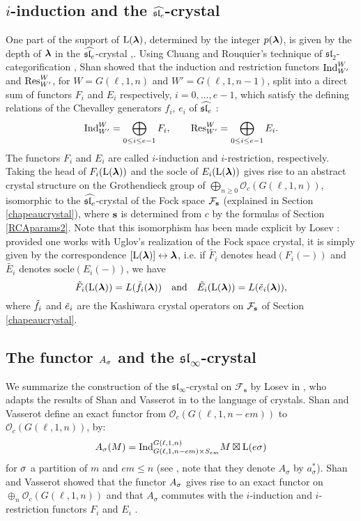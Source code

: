 \documentclass[12pt]{amsart}
\numberwithin{equation}{section}
\theoremstyle{definition}
\newcommand{\oh}{\mathcal{O}}
\newcommand{\el}{\mathrm{L}}
\newcommand{\slinf}{\mathfrak{sl}_\infty}
\newcommand{\mbs}{\mathbf{s}}
\begin{document}
\subsection{$i$-induction and the $\widehat{\mathfrak{sl}_e}$-crystal}\label{shancat} 
One part of the support of $\el(\bla)$, determined by the integer $p(\boldsymbol{\lambda})$, is  given by the depth of $\boldsymbol{\lambda}$ in the $\widehat{\mathfrak{sl}_e}$-crystal \cite{Shan2011},\cite{Losev2015}. Using Chuang and Rouquier's technique of $\mathfrak{sl}_2$-categorification \cite{ChuangRouquier2008}, Shan showed that the induction and restriction functors $\mbox{\rm Ind}_{W'}^W$ and $\mbox{\rm Res}_{W'}^W$,
for $W=G(\ell,1,n)$ and $W'=G(\ell,1,n-1)$, split into a direct sum of functors $F_i$ and $E_i$ respectively, $i=0,\dots, e-1$, which satisfy the defining relations of the Chevalley generators $f_i$, $e_i$ of $\widehat{\mathfrak{sl}_e}$ \cite{Shan2011}: 
$$\mbox{\rm Ind}_{W'}^W =\bigoplus_{0\leq i\leq e-1} F_i,\quad\quad \mbox{\rm Res}_{W'}^W=\bigoplus_{0\leq i\leq e-1}E_i.$$ 
The functors $F_i$ and $E_i$ are called $i$-induction and $i$-restriction, respectively. Taking the head of $F_i(\el(\bla))$ and the socle of $E_i(\el(\bla))$ gives rise to an abstract crystal structure on 
the Grothendieck group of $\bigoplus_{n\geq 0}\oh_c(G(\ell,1,n))$, 
isomorphic to the $\widehat{\mathfrak{sl}_e}$-crystal of the Fock space $\mathcal{F}_{\mathbf{s}}$ (explained in Section \ref{chapeaucrystal}), where $\mathbf{s}$ is determined from $c$ by the formulas of Section \ref{RCAparams2}.
Note that this isomorphism has been made explicit by Losev \cite[Theorem 5.1]{Losev2013}: 
provided one works with Uglov's realization of the Fock space crystal, it is simply given by the correspondence $[\el(\bla)]\leftrightarrow \bla$, i.e.
if $\tilde{F_i}$ denotes $\mathrm{head}(F_i(-))$ and $\tilde{E_i}$ denotes $\mathrm{socle}(E_i(-))$, we have
$$ \tilde{F_i}(\el(\bla)) = L(\tf_i(\bla)) \mand \tilde{E_i}(\el(\bla)) = L(\te_i(\bla)),$$
where ${\tilde{f}}_i$ and ${\tilde{e}}_i$ are the Kashiwara crystal operators on $\mathcal{F}_{\mathbf{s}}$ of Section \ref{chapeaucrystal}.


\subsection{The functor $A_\sigma$ and the $\slinf$-crystal}\label{amu}
We summarize the construction of the $\slinf$-crystal on $\mathcal{F}_\mbs$ by Losev in \cite[Section 5.1]{Losev2015}, who adapts the results of Shan and Vasserot in \cite[Section 5.6]{ShanVasserot2012} to the language of crystals. Shan and Vasserot define an exact functor from  $\oh_c(G(\ell,1,n-em))$ to $\oh_c(G(\ell,1,n))$, by: 
$$A_\si(M)=\Ind_{G(\ell,1,n-em)\times S_{em}}^{G(\ell,1,n)} M\boxtimes \el(e\si)$$
for $\sigma$ a partition of $m$ and $em\leq n$ (see \cite[Definition 5.12]{ShanVasserot2012}, note that they denote $A_\sigma$ by $a^*_\sigma$). Shan and Vasserot showed that the functor $A_\sigma$ gives rise to an exact functor on $\oplus_n \oh_c(G(\ell,1,n))$ and that $A_\sigma$ commutes with the $i$-induction and $i$-restriction functors $F_i$ and $E_i$ \cite[Proposition 5.15]{ShanVasserot2012}.
\end{document}
